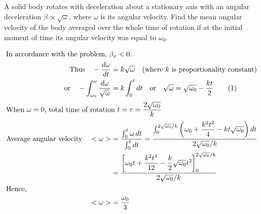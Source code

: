 
\item A solid body rotates with deceleration about a stationary axis with an angular deceleration \(\beta \propto \sqrt{\omega}\), where \(\omega\) is its angular velocity. Find the mean angular velocity of the body averaged over the whole time of rotation if at the initial moment of time its angular velocity was equal to \(\omega_0\).

\begin{solution}
    \begin{align*}
        \intertext{In accordance with the problem, $\beta_x < 0$.}
        \text{Thus} \quad -\dfrac{d\omega}{dt} &= k \sqrt{\omega} \quad (\text{where } k \text{ is proportionality constant})\\
        \text{or} \quad -\int_{\omega_0}^{\omega} \dfrac{d\omega}{\sqrt{\omega}} &= k \int_{0}^{t} dt \quad \text{or} \quad \sqrt{\omega} = \sqrt{\omega_0} - \dfrac{kt}{2} \tag{1}\\
        \intertext{When \(\omega = 0\), total time of rotation \(t = \tau = \dfrac{2\sqrt{\omega_0}}{k}\)}
        \text{Average angular velocity} \quad <\omega> &= \dfrac{\int_{0}^{t} \omega \, dt}{\int_{0}^{t} dt} = \dfrac{\int_{0}^{2\sqrt{\omega_0}/k} \left(\omega_0 + \dfrac{k^2 t^2}{4} - kt \sqrt{\omega_0}\right) dt}{2\sqrt{\omega_0}/k}\\
        &= \dfrac{\left[ \omega_0 t + \dfrac{k^2 t^3}{12} - \dfrac{k}{2} \sqrt{\omega_0} t^2 \right]_0^{2\sqrt{\omega_0}/k}}{2\sqrt{\omega_0}/k}\\
        \intertext{Hence,}
        <\omega> &= \dfrac{\omega_0}{3}
    \end{align*}
\end{solution}
